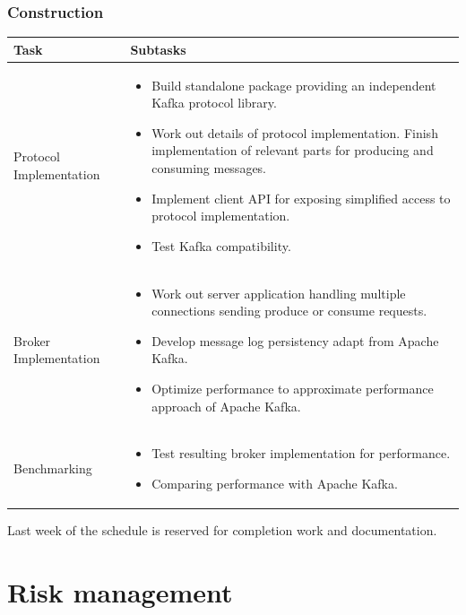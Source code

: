 \subsubsection{Construction}
\begin{tabular}[H]{|p{6cm}|p{10cm}|}\hline
   \textbf{Task} & \textbf{Subtasks} \\ \hline
    Protocol Implementation &
        \begin{itemize}
            \item Build standalone package providing an independent Kafka
                protocol library.
            \item Work out details of protocol implementation. Finish
                implementation of relevant parts for producing and consuming
                messages. 
            \item Implement client API for exposing simplified access to protocol
                implementation.
            \item Test Kafka compatibility.
        \end{itemize} \\ \hline
    Broker Implementation &
        \begin{itemize}
            \item Work out server application handling multiple connections
            sending produce or consume requests.
            \item Develop message log persistency adapt from Apache Kafka. 
            \item Optimize performance to approximate performance approach of
            Apache Kafka. 
        \end{itemize} \\ \hline
    Benchmarking &
        \begin{itemize}
            \item Test resulting broker implementation for performance.
            \item Comparing performance with Apache Kafka.
        \end{itemize} \\ \hline
\end{tabular}

Last week of the schedule is reserved for completion work and documentation. 


\newpage
\section{Risk management}

